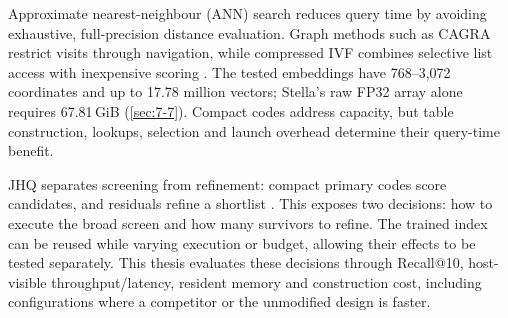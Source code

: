 Approximate nearest-neighbour (ANN) search reduces query time by avoiding
exhaustive, full-precision distance evaluation. Graph methods such as CAGRA
restrict visits through navigation, while compressed IVF combines selective
list access with inexpensive scoring \cite{cagra,johnson_gpu,ivfrabitq}.
The tested embeddings have 768--3,072 coordinates and up to 17.78 million
vectors; Stella's raw FP32 array alone requires 67.81\,GiB
(\cref{sec:7-7}). Compact codes address capacity, but table construction,
lookups, selection and launch overhead determine their query-time benefit.

JHQ separates screening from refinement: compact primary codes score
candidates, and residuals refine a shortlist \cite{jhq}. This exposes two
decisions: how to execute the broad screen and how many survivors to refine.
The trained index can be reused while varying execution or budget, allowing
their effects to be tested separately. This thesis evaluates these decisions
through Recall@10, host-visible throughput/latency, resident memory and
construction cost, including configurations where a competitor or the
unmodified design is faster.
